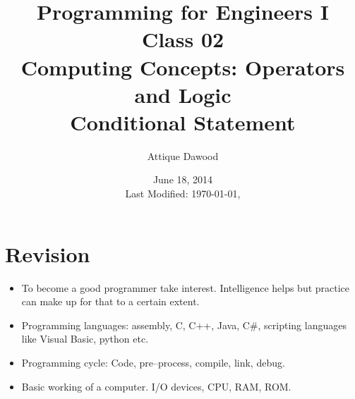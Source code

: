 \documentclass[12pt,a4paper]{article}
\title{Programming for Engineers I\\Class 02\\Computing Concepts: Operators and Logic\\Conditional Statement}
\author{Attique Dawood}
\date{June 18, 2014\\[0.2cm] Last Modified: \today, \currenttime}
\begin{document}
\maketitle
\section{Revision}
\begin{itemize}
\item To become a good programmer take interest. Intelligence helps but practice can make up for that to a certain extent.
\item Programming languages: assembly, C, C++, Java, C\#, scripting languages like Visual Basic, python etc.
\item Programming cycle: Code, pre--process, compile, link, debug.
\item Basic working of a computer. I/O devices, CPU, RAM, ROM.
\end{itemize}
\end{document}
